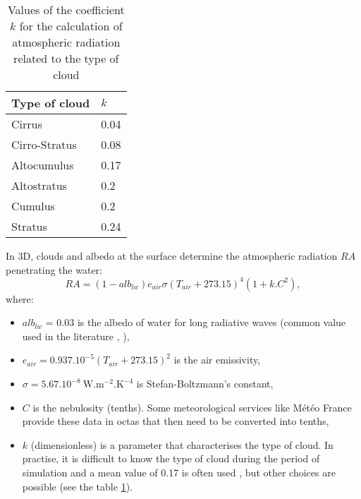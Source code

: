 \begin{table}[H]
\caption{Values of the coefficient $k$ for the calculation of atmospheric radiation related to the type of cloud}
\label{tab_cloud_type}
\centering
\begin{tabular}{p{0.98in}p{0.39in}}
\hline
\multicolumn{1}{|p{0.98in}}{Type of cloud} & 
\multicolumn{1}{|p{0.39in}|}{$k$} \\
\hline
\multicolumn{1}{|p{0.98in}}{Cirrus} & 
\multicolumn{1}{|p{0.39in}|}{0.04} \\
\hline
\multicolumn{1}{|p{0.98in}}{Cirro-Stratus} & 
\multicolumn{1}{|p{0.39in}|}{0.08} \\
\hline
\multicolumn{1}{|p{0.98in}}{Altocumulus} & 
\multicolumn{1}{|p{0.39in}|}{0.17} \\
\hline
\multicolumn{1}{|p{0.98in}}{Altostratus} & 
\multicolumn{1}{|p{0.39in}|}{0.2} \\
\hline
\multicolumn{1}{|p{0.98in}}{Cumulus} & 
\multicolumn{1}{|p{0.39in}|}{0.2} \\
\hline
\multicolumn{1}{|p{0.98in}}{Stratus} & 
\multicolumn{1}{|p{0.39in}|}{0.24} \\
\hline

\end{tabular}
\end{table}

In 3D, clouds and albedo at
the surface determine the atmospheric radiation $RA$ penetrating the water:
\begin{equation}
RA = (1-alb_{lw}) e_{air}\sigma(T_{air}+273.15)^{4}(1+k . C^{2}),
\end{equation}
where:
\begin{itemize}
\item $alb_{lw}$ = 0.03 is the albedo of water for long radiative waves
  (common value used in the literature \cite{imerito_dyresm_2007},
  \cite{henderson-sellers_energy_balance_1986}),
\item $e_{air} = 0.937.10^{-5}(T_{air}+273.15)^{2}$ is the air emissivity,
\item $\sigma= 5.67.10^{-8}~\mathrm{{W.m^{-2}.K^{-4}}}$ is Stefan-Boltzmann's constant,
\item $C$ is the nebulosity (tenths). Some meteorological services like
M\'{e}t\'{e}o France provide these data in octas that then need to be converted
into tenths,
\item $k$ (dimensionless) is a parameter that characterises the type of
cloud. In practise, it is difficult to know the type of cloud during the
period of simulation and a mean value of 0.17 is often used \cite{tva_heat_1972},
\cite{imerito_dyresm_2007} but other choices are possible
(see the table \ref{tab_cloud_type}).
\end{itemize}

